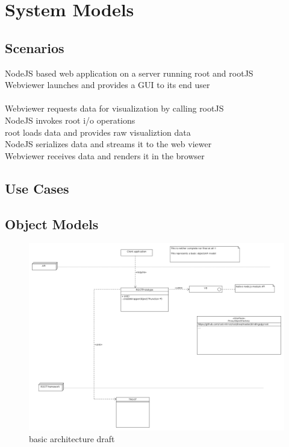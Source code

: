 \chapter{System Models}

\section{Scenarios}
NodeJS based web application on a server running root and rootJS\\
Webviewer launches and provides a GUI to its end user	\\
\\ Webviewer requests data for visualization by calling rootJS\\
\indent	NodeJS invokes root i/o operations\\
\indent \indent		root loads data and provides raw visualiztion data\\
\indent	NodeJS serializes data and streams it to the web viewer\\
Webviewer receives data and renders it in the browser\\
\section{Use Cases}

\pagebreak[4]

\section{Object Models}
\begin{figure}[htb]
	\centering
	\includegraphics[width=18cm]{./latex/resources/architecture.png}
	\caption{basic architecture draft}
\end{figure}

